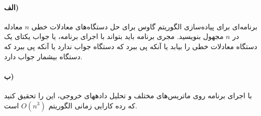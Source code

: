 \documentclass[]{article}
\begin{document}
\paragraph[1.1]{الف)}
برنامه‌ای برای پیاده‌سازی الگوریتم گاوس برای حل دستگاه‌های معادلات خطی $n$ معادله در $n$ مجهول بنویسید.
مجری برنامه باید بتواند با اجرای برنامه، یا جواب یکتای یک دستگاه معادلات خطی را بیابد یا آنکه پی ببرد که دستگاه جواب ندارد یا آنکه پی ببرد که دستگاه بیشمار جواب دارد.

\paragraph[1.2]{ب)}
با اجرای برنامه روی ماتریس‌های مختلف و تحلیل دادههای خروجی، این را تحقیق کنید که رده کارایی زمانی الگوریتم $O(n^3)$ است.
\end{document}
